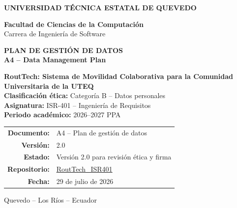 \documentclass[10pt,a4paper]{article}
\newcommand{\Proyecto}{RoutTech: Sistema de Movilidad Colaborativa para la Comunidad Universitaria de la UTEQ}
\newcommand{\Asignatura}{ISR-401 -- Ingeniería de Requisitos}
\newcommand{\Periodo}{2026--2027 PPA}
\newcommand{\CategoriaEtica}{Categoría B -- Datos personales}
\newcommand{\Repositorio}{https://github.com/AnderJM3/RoutTech_ISR401}
\newcommand{\FechaDocumento}{29 de julio de 2026}
\newcommand{\VersionDocumento}{2.0}
\newcommand{\EstadoDocumento}{Versión 2.0 para revisión ética y firma}
\begin{document}
\justifying

\thispagestyle{empty}

\vspace*{0.65cm}
\begin{center}
{\color{white}\Large\bfseries UNIVERSIDAD TÉCNICA ESTATAL DE QUEVEDO}

\vspace{1.75cm}
{\large\bfseries\color{RTForest} Facultad de Ciencias de la Computación\\[4pt]}
{\normalsize\color{RTGray} Carrera de Ingeniería de Software}

\vspace{0.8cm}

{\Huge\bfseries\color{RTForest} PLAN DE GESTIÓN DE DATOS\\[8pt]}
{\Large\bfseries\color{RTTerracotta} A4 -- Data Management Plan}

\vspace{1.0cm}

\begin{tcolorbox}[width=0.90\textwidth,colback=RTCream,colframe=RTGold,boxrule=1pt,arc=2mm]
\centering
{\large\bfseries \Proyecto}\\[7pt]
\textbf{Clasificación ética:} \CategoriaEtica\\
\textbf{Asignatura:} \Asignatura\\
\textbf{Periodo académico:} \Periodo
\end{tcolorbox}

\vfill
\begin{tabular}{rl}
\textbf{Documento:} & A4 -- Plan de gestión de datos\\
\textbf{Versión:} & \VersionDocumento\\
\textbf{Estado:} & \EstadoDocumento\\
\textbf{Repositorio:} & \href{\Repositorio}{RoutTech\_ISR401}\\
\textbf{Fecha:} & \FechaDocumento
\end{tabular}

\vspace{0.75cm}
{\small Quevedo -- Los Ríos -- Ecuador}
\end{center}
\clearpage
\end{document}
